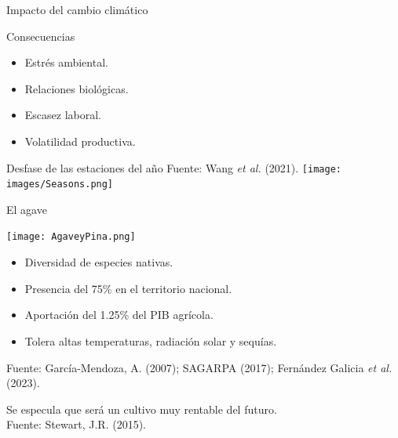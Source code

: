 \documentclass[aspectratio=169]{beamer}
\begin{document}
\begin{frame}{Impacto del cambio climático}
\vspace{-1cm}

\begin{block}{\centering Consecuencias}
       \begin{minipage}{0.5\textwidth}
			\begin{itemize}
				\item Estrés ambiental.
                \item Relaciones biológicas.
			\end{itemize}
		\end{minipage}%
		\begin{minipage}{0.5\textwidth}
			\begin{itemize}
				\item Escasez laboral.
                \item Volatilidad productiva.
			\end{itemize}
		\end{minipage}
    \end{block}
    \pause
    \begin{block}{Desfase de las estaciones del año \hfill {\scriptsize Fuente: Wang \textit{et al.} (2021).}}
    \centering
        \texttt{[image: images/Seasons.png]}
    \end{block}
\end{frame}


\begin{frame}{El agave}
	\begin{minipage}{0.5\textwidth}
		\centering\texttt{[image: AgaveyPina.png]}
	\end{minipage}%
	\begin{minipage}{0.5\textwidth}
		\begin{block}{}
			\begin{itemize}
				\item Diversidad de especies nativas.
				\item Presencia del 75\% en el territorio nacional.
				\item Aportación del 1.25\% del PIB agrícola.
				\item Tolera altas temperaturas, radiación solar y sequías.
			\end{itemize}
			 {\scriptsize Fuente: García-Mendoza, A. (2007); SAGARPA (2017);  Fernández Galicia \textit{et al.} (2023).}
		\end{block}
	\end{minipage}
	\pause\centering Se especula que será un cultivo muy rentable del futuro.\\
	{\scriptsize Fuente: Stewart, J.R. (2015).}
\end{frame}
\end{document}
